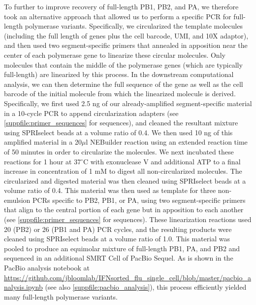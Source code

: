 \documentclass[10pt,letterpaper]{article}
\newcommand{\SUPPFILE}[1]{\autoref{suppfile:#1}}
\begin{document}
To further to improve recovery of full-length PB1, PB2, and PA, we therefore took an alternative approach that allowed us to perform a specific PCR for full-length polymerase variants.
Specifically, we circularized the template molecules (including the full length of genes plus the cell barcode, UMI, and 10X adaptor), and then used two segment-specific primers that annealed in apposition near the center of each polymerase gene to linearize these circular molecules.
Only molecules that contain the middle of the polymerase genes (which are typically full-length) are linearized by this process.
In the downstream computational analysis, we can then determine the full sequence of the gene as well as the cell barcode of the initial molecule from which the linearized molecule is derived.
Specifically, we first used 2.5 ng of our already-amplified segment-specific material in a 10-cycle PCR to append circularization adapters (see \SUPPFILE{primer_sequences} for sequences), and cleaned the resultant mixture using SPRIselect beads at a volume ratio of 0.4.
We then used 10 ng of this amplified material in a 20$\mu$l NEBuilder reaction using an extended reaction time of 50 minutes in order to circularize the molecules.
We next incubated these reactions for 1 hour at 37$^{\circ}$C with exonuclease V and additional ATP to a final increase in concentration of 1 mM to digest all non-circularized molecules.
The circularized and digested material was then cleaned using SPRIselect beads at a volume ratio of 0.4.
This material was then used as template for three non-emulsion PCRs specific to PB2, PB1, or PA, using two segment-specific primers that align to the central portion of each gene but in apposition to each another (see \SUPPFILE{primer_sequences} for sequences).
These linearization reactions used 20 (PB2) or 26 (PB1 and PA) PCR cycles, and the resulting products were cleaned using SPRIselect beads at a volume ratio of 1.0.
This material was pooled to produce an equimolar mixture of full-length PB1, PA, and PB2 and sequenced in an additional SMRT Cell of PacBio Sequel. 
As is shown in the PacBio analysis notebook at \url{https://github.com/jbloomlab/IFNsorted_flu_single_cell/blob/master/pacbio_analysis.ipynb} (see also \SUPPFILE{pacbio_analysis}), this process efficiently yielded many full-length polymerase variants.
\end{document}
